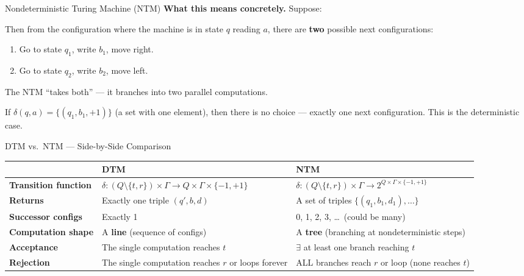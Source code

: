 \begin{definitionbox}{Nondeterministic Turing Machine (NTM)}
\textbf{What this means concretely.} Suppose:

Then from the configuration where the machine is in state $q$ reading $a$,
there are \textbf{two} possible next configurations:
\begin{enumerate}[nosep]
\item Go to state $q_1$, write $b_1$, move right.
\item Go to state $q_2$, write $b_2$, move left.
\end{enumerate}
The NTM ``takes both'' --- it branches into two parallel computations.

If $\delta(q, a) = \{(q_1, b_1, +1)\}$ (a set with one element), then there is
no choice --- exactly one next configuration. This is the deterministic case.

\end{definitionbox}

\begin{examplebox}{DTM vs.\ NTM --- Side-by-Side Comparison}
\begin{center}
\renewcommand{\arraystretch}{1.5}
\begin{tabular}{p{3.5cm}p{5.5cm}p{5.5cm}}
\toprule
& \textbf{DTM} & \textbf{NTM} \\
\midrule
\textbf{Transition function} &
  $\delta \colon (Q \setminus \{t,r\}) \times \Gamma \to Q \times \Gamma \times \{-1,+1\}$ &
  $\delta \colon (Q \setminus \{t,r\}) \times \Gamma \to 2^{Q \times \Gamma \times \{-1,+1\}}$ \\
\textbf{Returns} &
  Exactly one triple $(q', b, d)$ &
  A set of triples $\{(q_1, b_1, d_1), \ldots\}$ \\
\textbf{Successor configs} &
  Exactly 1 &
  0, 1, 2, 3, \ldots\ (could be many) \\
\textbf{Computation shape} &
  A \textbf{line} (sequence of configs) &
  A \textbf{tree} (branching at nondeterministic steps) \\
\textbf{Acceptance} &
  The single computation reaches $t$ &
  $\exists$ at least one branch reaching $t$ \\
\textbf{Rejection} &
  The single computation reaches $r$ or loops forever &
  ALL branches reach $r$ or loop (none reaches $t$) \\
\bottomrule
\end{tabular}
\end{center}

\end{examplebox}

